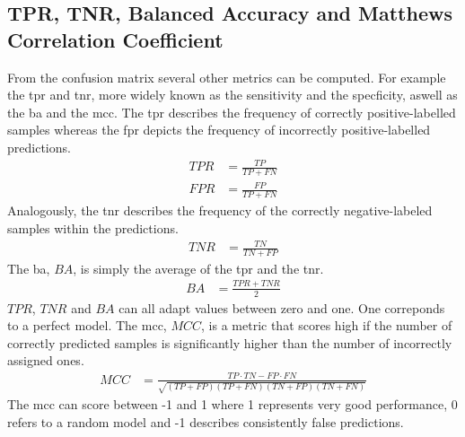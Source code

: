 \subsection{TPR, TNR, Balanced Accuracy and Matthews Correlation Coefficient}\label{sec:metrics}
From the confusion matrix several other metrics can be computed. For example the \ac{tpr} and \ac{tnr}, more widely known as the sensitivity and the specficity, aswell as the \ac{ba} and the \ac{mcc}. The \ac{tpr} describes the frequency of correctly positive-labelled samples whereas the \ac{fpr} depicts the frequency of incorrectly positive-labelled predictions.\cite{Fawcett2006}
\begin{align}\label{eq:tpr}
TPR & =\frac{TP}{TP+FN}
\\FPR & =\frac{FP}{TP+FN}
\end{align}
Analogously, the \ac{tnr} describes the frequency of the correctly negative-labeled samples within the predictions.\cite{Fawcett2006}
\begin{align}\label{eq:tnr}
TNR & = \frac{TN}{TN+FP}
\end{align}
The \acl{ba}, $BA$, is simply the average of the \ac{tpr} and the \ac{tnr}.\cite{Kelleher2015}
\begin{align}\label{eq:balacc}
BA & = \frac{TPR+TNR}{2}
\end{align}
$TPR$, $TNR$ and $BA$ can all adapt values between zero and one. One correponds to a perfect model. The \acl{mcc}, $MCC$, is a metric that scores high if the number of correctly predicted samples is significantly higher than the number of incorrectly assigned ones.\cite{Boughorbel2017}
\begin{align}\label{eq:mcc}
MCC & = \frac{TP\cdot TN - FP\cdot FN }{\sqrt{\left(TP+FP\right)\left(TP+FN\right)\left(TN+FP\right)\left(TN+FN\right)}}
\end{align}
The \ac{mcc} can score between -1 and 1 where 1 represents very good performance, 0 refers to a random model and -1 describes consistently false predictions.\cite{Boughorbel2017}
%
